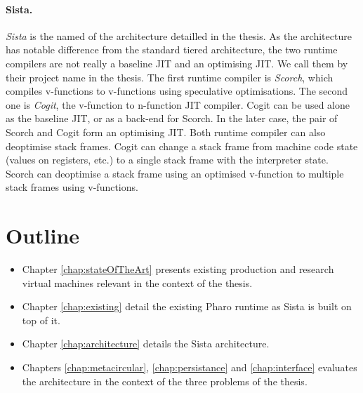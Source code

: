 \documentclass[a4paper,12pt,twoside]{../includes/ThesisStyle}
\begin{document}
\paragraph{Sista.} \emph{Sista} is the named of the architecture detailled in the thesis. As the architecture has notable difference from the standard tiered architecture, the two runtime compilers are not really a baseline JIT and an optimising JIT. We call them by their project name in the thesis. The first runtime compiler is \emph{Scorch}, which compiles v-functions to v-functions using speculative optimisations. The second one is \emph{Cogit}, the v-function to n-function JIT compiler. Cogit can be used alone as the baseline JIT, or as a back-end for Scorch. In the later case, the pair of Scorch and Cogit form an optimising JIT. Both runtime compiler can also deoptimise stack frames. Cogit can change a stack frame from machine code state (values on registers, etc.) to a single stack frame with the interpreter state. Scorch can deoptimise a stack frame using an optimised v-function to multiple stack frames using v-functions.

\section{Outline}

\begin{itemize}
	\item Chapter \ref{chap:stateOfTheArt} presents existing production and research virtual machines relevant in the context of the thesis. 
	\item Chapter \ref{chap:existing} detail the existing Pharo runtime as Sista is built on top of it.
	\item Chapter \ref{chap:architecture} details the Sista architecture. 
	\item Chapters \ref{chap:metacircular}, \ref{chap:persistance} and \ref{chap:interface} evaluates the architecture in the context of the three problems of the thesis.
\end{itemize}



\ifx\wholebook\relax\else
    
\end{document}
